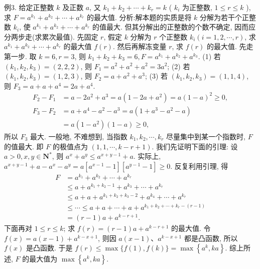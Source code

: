 例3. 给定正整数 $k$ 及正数 $a$, 又 $k_1+k_2+\cdots+k_r=k$ ( $k_i$ 为正整数, $1 \leqslant r \leqslant k$ ), 求 $F=a^{k_1}+a^{k_2}+\cdots+a^{k_r}$ 的最大值.
分析:解本题的实质是将 $k$ 分解为若干个正整数 $k_i$, 使 $a^{k_1}+a^{k_2}+\cdots+ a^{k_r}$ 的值最大.
但其分解出的正整数的个数不确定, 因而应分两步走(求累次最值). 先固定 $r$, 假定 $k$ 分解为 $r$ 个正整数 $k_i(i=1,2, \cdots, r)$, 求 $a^{k_1}+a^{k_2}+\cdots +a^{k_r}$ 的最大值 $f(r)$. 然后再解冻变量 $r$, 求 $f(r)$ 的最大值.
先走第一步.
取 $k=6, r=3$, 则 $k_1+k_2+k_3=6, F=a^{k_1}+a^{k_2}+a^{k_3}$.
(1) 若 $\left(k_1, k_2, k_3\right)=(2,2,2)$, 则 $F_1=a^2+a^2+a^2=3 a^2$;
(2) 若 $\left(k_1, k_2, k_3\right)=(1,2,3)$, 则 $F_2=a+a^2+a^3$;
(3) 若 $\left(k_1, k_2, k_3\right)=(1,1,4)$, 则 $F_3=a+a+a^4=2 a+a^4$.
$$
\begin{aligned}
F_2-F_1 & =a-2 a^2+a^3=a\left(1-2 a+a^2\right)=a(1-a)^2 \geqslant 0, \\
F_3-F_2 & =a+a^4-a^2-a^3=a\left(1+a^3-a^2-a\right) \\
& =a\left(1-a^2\right)(1-a) \geqslant 0,
\end{aligned}
$$
所以 $F_3$ 最大.
一般地, 不难想到, 当指数 $k_1, k_2, \cdots, k_r$ 尽量集中到某一个指数时, $F$ 的值最大.
即 $F$ 的极值点为 $(1,1, \cdots, k-r+1)$. 我们先证明下面的引理: 设 $a>0, x, y \in \mathbf{N}^*$, 则 $a^x+a^y \leqslant a^{x+y-1}+a$.
实际上, $a^{x+y-1}+a-a^x-a^y=a\left[a^{x-1}-1\right]\left[a^{y-1}-1\right] \geqslant 0$.
反复利用引理, 得
$$
\begin{aligned}
F & =a^{k_1}+a^{k_2}+\cdots+a^{k_r} \\
& \leqslant a+a^{k_1+k_2-1}+a^{k_3}+\cdots+a^{k_r} \\
& \leqslant a+a+a^{k_1+k_2+k_3-2}+a^{k_4}+\cdots+a^{k_r} \\
& \leqslant \cdots \leqslant a+a+\cdots+a+a^{k_1+k_2+\cdots+k_r-(r-1)} \\
& =(r-1) a+a^{k-r+1} .
\end{aligned}
$$
下面再对 $1 \leqslant r \leqslant k$; 求 $f(r)=(r-1) a+a^{k-r+1}$ 的最大值.
令 $f(x)=a(x-1)+a^{k-x+1}$, 则因 $a(x-1) 、 a^{k-x+1}$ 都是凸函数, 所以 $f(x)$ 是凸函数.
于是 $f(r) \leqslant \max \{f(1), f(k)\}=\max \left\{a^k, k a\right\}$.
综上所述, $F$ 的最大值为 $\max \left\{a^k, k a\right\}$.



